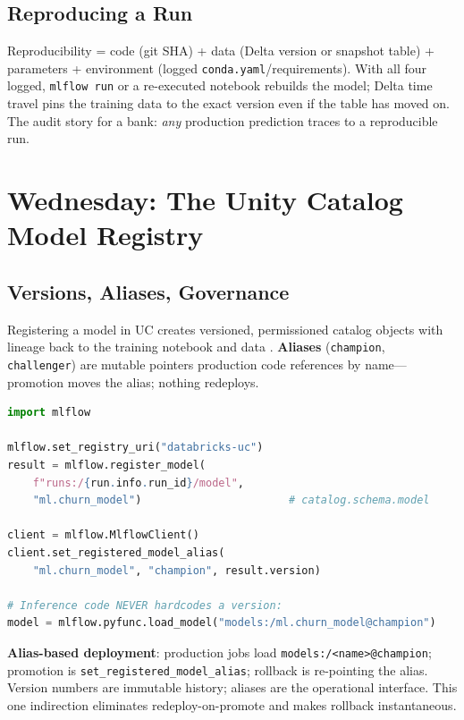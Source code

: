 \subsection{Reproducing a Run}
Reproducibility = code (git SHA) + data (Delta version or snapshot table) + parameters + environment (logged \texttt{conda.yaml}/requirements). With all four logged, \texttt{mlflow run} or a re-executed notebook rebuilds the model; Delta time travel pins the training data to the exact version even if the table has moved on. The audit story for a bank: \emph{any} production prediction traces to a reproducible run.

\section{Wednesday: The Unity Catalog Model Registry}
\subsection{Versions, Aliases, Governance}
Registering a model in UC creates versioned, permissioned catalog objects with lineage back to the training notebook and data \cite{databricksMLflow}. \textbf{Aliases} (\texttt{champion}, \texttt{challenger}) are mutable pointers production code references by name---promotion moves the alias; nothing redeploys.

\begin{lstlisting}[language=Python,caption={Register, promote by alias, load by alias.},label={lst:ch17-registry}]
import mlflow

mlflow.set_registry_uri("databricks-uc")
result = mlflow.register_model(
    f"runs:/{run.info.run_id}/model",
    "ml.churn_model")                       # catalog.schema.model

client = mlflow.MlflowClient()
client.set_registered_model_alias(
    "ml.churn_model", "champion", result.version)

# Inference code NEVER hardcodes a version:
model = mlflow.pyfunc.load_model("models:/ml.churn_model@champion")
\end{lstlisting}

\begin{definitionbox}
\textbf{Alias-based deployment}: production jobs load \texttt{models:/<name>@champion}; promotion is \texttt{set\_registered\_model\_alias}; rollback is re-pointing the alias. Version numbers are immutable history; aliases are the operational interface. This one indirection eliminates redeploy-on-promote and makes rollback instantaneous.
\end{definitionbox}

